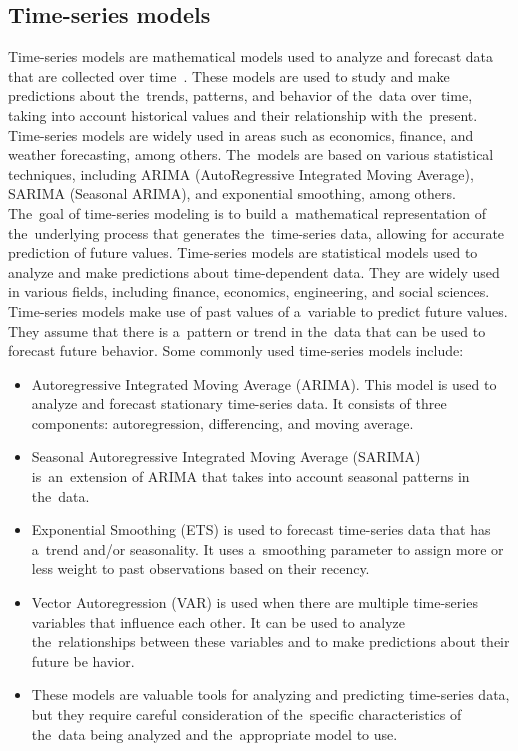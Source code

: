 \subsection{Time-series models}\label{sec:timeseries}
Time-series models are mathematical models used to analyze and forecast data that are collected over time~\cite{Cryer}.
These models are used to study and make predictions about the~trends, patterns, and behavior of the~data over time,
taking into account historical values and their relationship with the~present. Time-series models are widely
used in areas such as economics, finance, and weather forecasting, among others. The~models are based on various
statistical techniques, including ARIMA (AutoRegressive Integrated Moving Average), SARIMA (Seasonal ARIMA),
and exponential smoothing, among others. The~goal of time-series modeling is to build a~mathematical representation
of the~underlying process that generates the~time-series data, allowing for accurate prediction of future values.
Time-series models are statistical models used to analyze and make predictions about time-dependent data. They are
widely used in various fields, including finance, economics, engineering, and social sciences.
\\
Time-series models make use of past values of a~variable to predict future values.
They assume that there is a~pattern or trend in the~data that can be used to forecast future behavior.
Some commonly used time-series models include:
\begin{itemize}
    \item Autoregressive Integrated Moving Average (ARIMA). This model is used to analyze and forecast stationary
    time-series data. It consists of three components: autoregression, differencing, and moving average.
    \item Seasonal Autoregressive Integrated Moving Average (SARIMA) is~an~extension of ARIMA
    that takes into account seasonal patterns in the~data.
    \item Exponential Smoothing (ETS) is used to forecast time-series data that has a~trend
    and/or seasonality. It uses a~smoothing parameter to assign more or less weight to past observations
    based on their recency.
    \item Vector Autoregression (VAR) is used when there are multiple time-series variables
    that influence each other. It can be used to analyze the~relationships between these variables and to make
    predictions about their future be   havior.
    \item These models are valuable tools for analyzing and predicting time-series data, but they require careful
    consideration of the~specific characteristics of the~data being analyzed and the~appropriate model to use.
\end{itemize}

